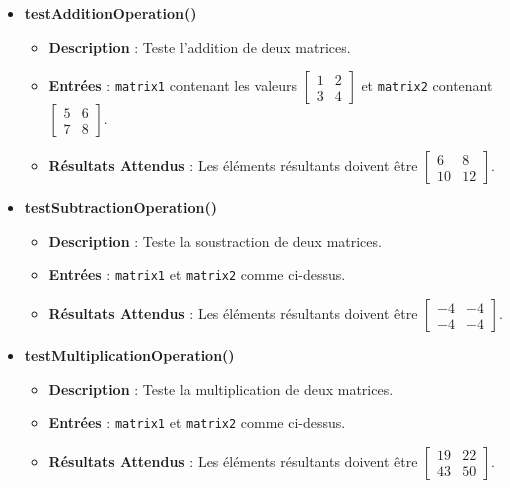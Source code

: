 \documentclass[12pt, a4paper, onecolumn]{article}
\begin{document}
	\begin{itemize}
		\item \textbf{testAdditionOperation()}
		\begin{itemize}
			\item \textbf{Description} : Teste l'addition de deux matrices.
			\item \textbf{Entrées} : \texttt{matrix1} contenant les valeurs $\begin{bmatrix} 1 & 2 \\ 3 & 4 \end{bmatrix}$ et \texttt{matrix2} contenant $\begin{bmatrix} 5 & 6 \\ 7 & 8 \end{bmatrix}$.
			\item \textbf{Résultats Attendus} : Les éléments résultants doivent être $\begin{bmatrix} 6 & 8 \\ 10 & 12 \end{bmatrix}$.
		\end{itemize}
		
		\item \textbf{testSubtractionOperation()}
		\begin{itemize}
			\item \textbf{Description} : Teste la soustraction de deux matrices.
			\item \textbf{Entrées} : \texttt{matrix1} et \texttt{matrix2} comme ci-dessus.
			\item \textbf{Résultats Attendus} : Les éléments résultants doivent être $\begin{bmatrix} -4 & -4 \\ -4 & -4 \end{bmatrix}$.
		\end{itemize}
		
		\item \textbf{testMultiplicationOperation()}
		\begin{itemize}
			\item \textbf{Description} : Teste la multiplication de deux matrices.
			\item \textbf{Entrées} : \texttt{matrix1} et \texttt{matrix2} comme ci-dessus.
			\item \textbf{Résultats Attendus} : Les éléments résultants doivent être $\begin{bmatrix} 19 & 22 \\ 43 & 50 \end{bmatrix}$.
		\end{itemize}
		

\end{itemize}
\end{document}
